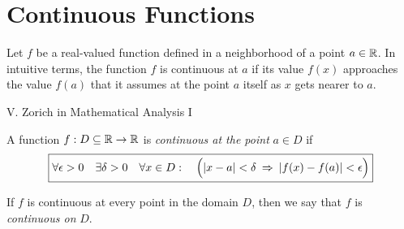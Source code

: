 \section{Continuous Functions}

\epigraph{Let $f$ be a real-valued function defined in a neighborhood of a point $a \in \R$. In intuitive terms, the function $f$ is continuous at $a$ if its value $f(x)$ approaches the value $f(a)$ that it assumes at the point $a$ itself as $x$ gets nearer to $a$.}{V. Zorich in Mathematical Analysis I}

\begin{definition}\label{def:continuous}
    A function $f: D\subseteq \R \to \R$ is \textit{continuous at the point} $a \in D$ if
    \begin{align*}
    \boxed{
        \forall \epsilon > 0 \quad \exists \delta > 0
        \quad \forall x \in D: \quad
        \Bigl(|x - a| < \delta \: \implies \: |f(x) - f(a)| < \epsilon \Bigr)
    }
    \end{align*}

    If $f$ is continuous at every point in the domain $D$, then we say that $f$ is \textit{continuous on} $D$.
\end{definition}
